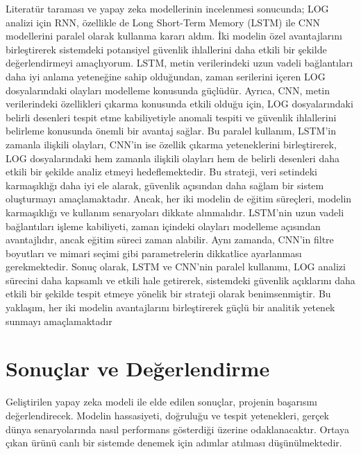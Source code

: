 \documentclass[12pt,a4paper]{article}
\begin{document}
\begin{enumerate}
\begin{itemize}
Literatür taraması ve yapay zeka modellerinin incelenmesi sonucunda; LOG analizi için RNN, özellikle de Long Short-Term Memory (LSTM) ile CNN modellerini paralel olarak kullanma kararı aldım. İki modelin özel avantajlarını birleştirerek sistemdeki potansiyel güvenlik ihlallerini daha etkili bir şekilde değerlendirmeyi amaçlıyorum. LSTM, metin verilerindeki uzun vadeli bağlantıları daha iyi anlama yeteneğine sahip olduğundan, zaman serilerini içeren LOG dosyalarındaki olayları modelleme konusunda güçlüdür. Ayrıca, CNN, metin verilerindeki özellikleri çıkarma konusunda etkili olduğu için, LOG dosyalarındaki belirli desenleri tespit etme kabiliyetiyle anomali tespiti ve güvenlik ihlallerini belirleme konusunda önemli bir avantaj sağlar.\newline \newline
Bu paralel kullanım, LSTM'in zamanla ilişkili olayları, CNN'in ise özellik çıkarma yeteneklerini birleştirerek, LOG dosyalarındaki hem zamanla ilişkili olayları hem de belirli desenleri daha etkili bir şekilde analiz etmeyi hedeflemektedir. Bu strateji, veri setindeki karmaşıklığı daha iyi ele alarak, güvenlik açısından daha sağlam bir sistem oluşturmayı amaçlamaktadır. \newline \newline
Ancak, her iki modelin de eğitim süreçleri, modelin karmaşıklığı ve kullanım senaryoları dikkate alınmalıdır. LSTM'nin uzun vadeli bağlantıları işleme kabiliyeti, zaman içindeki olayları modelleme açısından avantajlıdır, ancak eğitim süreci zaman alabilir. Aynı zamanda, CNN'in filtre boyutları ve mimari seçimi gibi parametrelerin dikkatlice ayarlanması gerekmektedir.\newline\newline
Sonuç olarak, LSTM ve CNN'nin paralel kullanımı, LOG analizi sürecini daha kapsamlı ve etkili hale getirerek, sistemdeki güvenlik açıklarını daha etkili bir şekilde tespit etmeye yönelik bir strateji olarak benimsenmiştir. Bu yaklaşım, her iki modelin avantajlarını birleştirerek güçlü bir analitik yetenek sunmayı amaçlamaktadır
  \end{itemize}
  \section{Sonuçlar ve Değerlendirme}
\begin{itemize}
Geliştirilen yapay zeka modeli ile elde edilen sonuçlar, projenin başarısını değerlendirecek. Modelin hassasiyeti, doğruluğu ve tespit yetenekleri, gerçek dünya senaryolarında nasıl performans gösterdiği üzerine odaklanacaktır. Ortaya çıkan ürünü canlı bir sistemde denemek için adımlar atılması düşünülmektedir. \newline

\end{itemize}
\end{enumerate}
\end{document}
